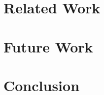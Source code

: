 \documentclass{article}
\begin{document}

\section{Related Work}
\label{sec:related-work}


\section{Future Work}
\label{sec:future-work}

\section{Conclusion}
\label{sec:conclusion}

\printbibliography
\end{document}
